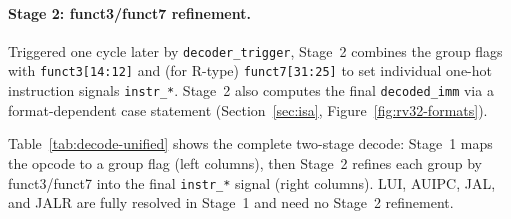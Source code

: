 \documentclass[9pt, a4paper]{extarticle}
\begin{document}
\paragraph{Stage 2: funct3/funct7 refinement.} Triggered one cycle later by \texttt{decoder\_trigger}, Stage~2 combines the group flags with \texttt{funct3[14:12]} and (for R-type) \texttt{funct7[31:25]} to set individual one-hot instruction signals \texttt{instr\_*}. Stage~2 also computes the final \texttt{decoded\_imm} via a format-dependent case statement (Section~\ref{sec:isa}, Figure~\ref{fig:rv32-formats}).

Table~\ref{tab:decode-unified} shows the complete two-stage decode: Stage~1 maps the opcode to a group flag (left columns), then Stage~2 refines each group by funct3/funct7 into the final \texttt{instr\_*} signal (right columns). LUI, AUIPC, JAL, and JALR are fully resolved in Stage~1 and need no Stage~2 refinement.
\end{document}
